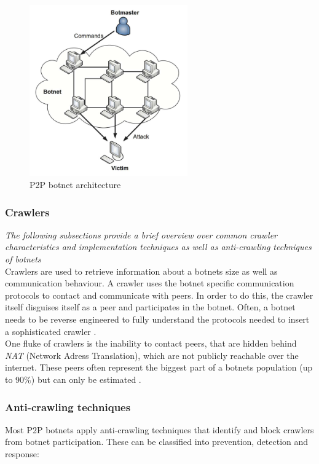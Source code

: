 \documentclass{article}
\begin{document}
\begin{figure}[H]
    \centering
    \includegraphics[width=6.8cm]{DecentralisedBotnet.png}
    \caption{P2P botnet architecture \cite{SurveyArchitectures}}
    \label{fig:P2PArchitecture}
\end{figure}

\subsubsection{Crawlers}
\emph{The following subsections provide a brief overview over common crawler characteristics and implementation techniques as well as anti-crawling techniques of botnets} \\

Crawlers are used to retrieve information about a botnets size as well as communication behaviour. A crawler uses the botnet specific communication protocols to contact and communicate with peers. In order to do this, the crawler itself disguises itself as a peer and participates in the botnet. Often, a botnet needs to be reverse engineered to fully understand the protocols needed to insert a sophisticated crawler \cite{kang2009towards}. \\

One fluke of crawlers is the inability to contact peers, that are hidden behind \emph{NAT} (Network Adress Translation), which are not publicly reachable over the internet. These peers often represent the biggest part of a botnets population (up to 90\%) but can only be estimated \cite{AMP2P}.

\subsubsection{Anti-crawling techniques}
Most P2P botnets apply anti-crawling techniques that identify and block crawlers from botnet participation. These can be classified into prevention, detection and response:
\end{document}
